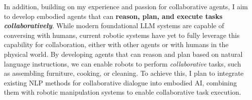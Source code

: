 \documentclass[10pt]{article}
\newcommand{\statement}[1]{\medskip\noindent
  \textcolor{black}{\textbf{#1}}\space
}
\newif\ifcomments
\newcommand{\todo}[1]{\ifcomments\textcolor{red}{TODO: #1}\fi}
\begin{document}
In addition, building on my experience and passion for collaborative agents, I aim to develop embodied agents that can \textbf{reason, plan, and execute tasks \textit{collaboratively}}. While modern foundational LLM systems are capable of conversing with humans, current robotic systems have yet to fully leverage this capability for collaboration, either with other agents or with humans in the physical world. By developing agents that can reason and plan based on natural language instructions, we can enable robots to perform \textit{collaborative} tasks, such as assembling furniture, cooking, or cleaning. To achieve this, I plan to integrate existing NLP methods for collaborative dialogue into embodied AI, combining them with robotic manipulation systems to enable collaborative task execution.

\statement{\todo{Why School}}
\end{document}
